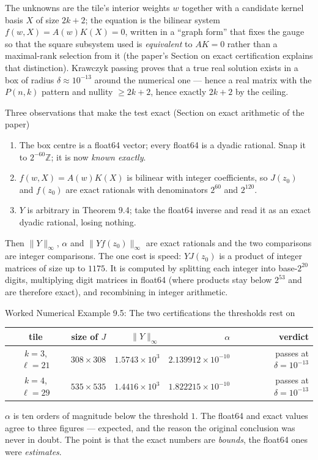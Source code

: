 \documentclass[11pt]{article}
\begin{document}
The unknowns are the tile's interior weights $w$ together with a candidate kernel basis $X$ of size $2k+2$; the equation is the bilinear system $f(w,X)=A(w)K(X)=0$, written in a ``graph form'' that fixes the gauge so that the square subsystem used is \emph{equivalent} to $AK=0$ rather than a maximal-rank selection from it (the paper's Section on exact certification explains that distinction). Krawczyk passing proves that a true real solution exists in a box of radius $\delta\approx10^{-13}$ around the numerical one --- hence a real matrix with the $P(n,k)$ pattern and nullity $\ge2k+2$, hence exactly $2k+2$ by the ceiling.

\begin{callbox}{Three observations that make the test exact (Section on exact arithmetic of the paper)}
\begin{enumerate}[leftmargin=*,nosep]
  \item The box centre is a float64 vector; every float64 is a dyadic rational. Snap it to $2^{-60}\mathbb Z$; it is now \emph{known exactly}.
  \item $f(w,X)=A(w)K(X)$ is bilinear with integer coefficients, so $J(z_0)$ and $f(z_0)$ are exact rationals with denominators $2^{60}$ and $2^{120}$.
  \item $Y$ is arbitrary in Theorem 9.4; take the float64 inverse and read it as an exact dyadic rational, losing nothing.
\end{enumerate}
Then $\|Y\|_\infty$, $\alpha$ and $\|Yf(z_0)\|_\infty$ are exact rationals and the two comparisons are integer comparisons. The one cost is speed: $YJ(z_0)$ is a product of integer matrices of size up to $1175$. It is computed by splitting each integer into base-$2^{20}$ digits, multiplying digit matrices in float64 (where products stay below $2^{53}$ and are therefore exact), and recombining in integer arithmetic.
\end{callbox}

\begin{callbox}{Worked Numerical Example 9.5: The two certifications the thresholds rest on}
\begin{center}
\begin{tabular}{crrrr}
\toprule
tile & size of $J$ & $\|Y\|_\infty$ & $\alpha$ & verdict \\
\midrule
$k=3$, $\ell=21$ & $308\times308$ & $1.5743\times10^{3}$ & $2.139912\times10^{-10}$ & passes at $\delta=10^{-13}$ \\
$k=4$, $\ell=29$ & $535\times535$ & $1.4416\times10^{3}$ & $1.822215\times10^{-10}$ & passes at $\delta=10^{-13}$ \\
\bottomrule
\end{tabular}
\end{center}
$\alpha$ is ten orders of magnitude below the threshold $1$. The float64 and exact values agree to three figures --- expected, and the reason the original conclusion was never in doubt. The point is that the exact numbers are \emph{bounds}, the float64 ones were \emph{estimates}.
\end{callbox}
\end{document}
